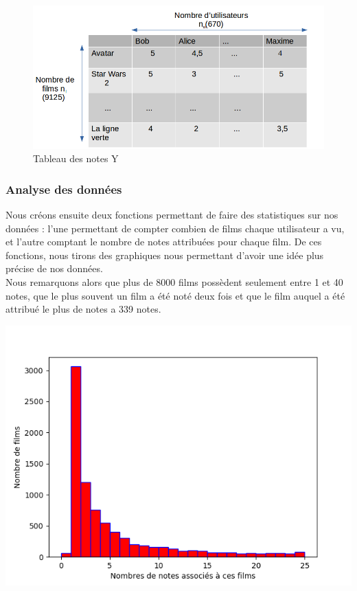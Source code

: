 \documentclass[a4paper,10pt]{article}
\begin{document}
\begin{figure}[h]
  \centering
  \includegraphics[scale=0.4]{Ynew.png}
  \caption{Tableau des notes Y}
 
\end{figure}



\subsubsection{Analyse des données}

Nous créons ensuite deux fonctions permettant de faire des statistiques sur nos données : l’une permettant de compter combien de films chaque utilisateur a vu, et l’autre comptant le nombre de notes attribuées pour chaque film. De ces fonctions, nous tirons des graphiques nous permettant d'avoir une idée plus précise de nos données.\\

Nous remarquons alors que plus de 8000 films possèdent seulement entre 1 et 40 notes, que le plus souvent un film a été noté deux fois et que le film auquel a été attribué le plus de notes a 339 notes.

\includegraphics[scale=0.5]{hist2.png}
\end{document}

